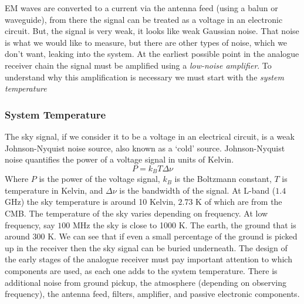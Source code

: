 \documentclass[usenatbib,usegraphicx]{article}
\begin{document}
EM waves are converted to a current via the antenna feed (using a balun or waveguide), from there the signal can be treated as a voltage in an electronic circuit.
But, the signal is very weak, it looks like weak Gaussian noise.
That noise is what we would like to measure, but there are other types of noise, which we don't want, leaking into the system.
At the earliest possible point in the analogue receiver chain the signal must be amplified using a \emph{low-noise amplifier}.
To understand why this amplification is necessary we must start with the \emph{system temperature}

\subsubsection{System Temperature}

The sky signal, if we consider it to be a voltage in an electrical circuit, is a weak Johnson-Nyquist noise source, also known as a `cold' source.
Johnson-Nyquist noise quantifies the power of a voltage signal in units of Kelvin.
%
\begin{equation}
\label{eq:johnson_noise}
P=k_B T \Delta \nu
\end{equation}
%
Where $P$ is the power of the voltage signal, $k_B$ is the Boltzmann constant, $T$ is temperature in Kelvin, and $\Delta \nu$ is the bandwidth of the signal.
At L-band ($1.4$ GHz) the sky temperature is around 10 Kelvin, $2.73$ K of which are from the CMB.
The temperature of the sky varies depending on frequency.
At low frequency, say $100$ MHz the sky is close to 1000 K.
The earth, the ground that is around 300 K.
We can see that if even a small percentage of the ground is picked up in the receiver then the sky signal can be buried underneath.
The design of the early stages of the analogue receiver must pay important attention to which components are used, as each one adds to the system temperature.
There is additional noise from ground pickup, the atmosphere (depending on observing frequency), the antenna feed, filters, amplifier, and passive electronic components.
\end{document}
